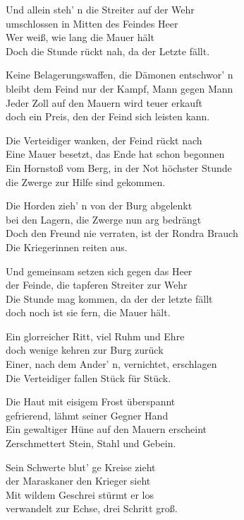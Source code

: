 Und allein steh' n die Streiter auf der Wehr\\
umschlossen in Mitten des Feindes Heer\\
Wer weiß, wie lang die Mauer hält\\
Doch die Stunde rückt nah, da der Letzte fällt.

Keine Belagerungswaffen, die Dämonen entschwor' n\\
bleibt dem Feind nur der Kampf, Mann gegen Mann\\
Jeder Zoll auf den Mauern wird teuer erkauft\\
doch ein Preis, den der Feind sich leisten kann.

Die Verteidiger wanken, der Feind rückt nach\\
Eine Mauer besetzt, das Ende hat schon begonnen\\
Ein Hornstoß vom Berg, in der Not höchster Stunde\\
die Zwerge zur Hilfe sind gekommen.

Die Horden zieh' n von der Burg abgelenkt\\
bei den Lagern, die Zwerge nun arg bedrängt\\
Doch den Freund nie verraten, ist der Rondra Brauch\\
Die Kriegerinnen reiten aus.

Und gemeinsam setzen sich gegen das Heer\\
der Feinde, die tapferen Streiter zur Wehr\\
Die Stunde mag kommen, da der der letzte fällt\\
doch noch ist sie fern, die Mauer hält.

Ein glorreicher Ritt, viel Ruhm und Ehre\\
doch wenige kehren zur Burg zurück\\
Einer, nach dem Ander' n, vernichtet, erschlagen\\
Die Verteidiger fallen Stück für Stück.

Die Haut mit eisigem Frost überspannt\\
gefrierend, lähmt seiner Gegner Hand\\
Ein gewaltiger Hüne auf den Mauern erscheint\\
Zerschmettert Stein, Stahl und Gebein.

Sein Schwerte blut' ge Kreise zieht\\
der Maraskaner den Krieger sieht\\
Mit wildem Geschrei stürmt er los\\
verwandelt zur Echse, drei Schritt groß.

